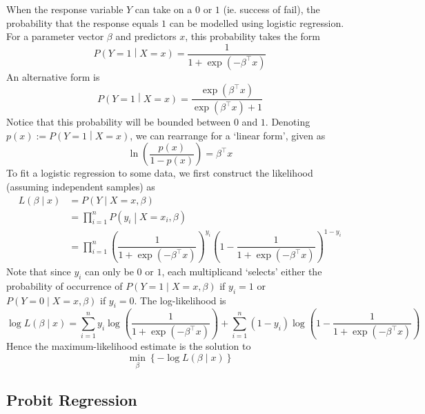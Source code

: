 \documentclass[11pt]{report} %
\begin{document}
When the response variable $Y$ can take on a $0$ or $1$ (ie. success of fail), the probability that the response equals $1$ can be modelled using logistic regression. For a parameter vector $\beta$ and predictors $x$, this probability takes the form
\begin{equation}
P\left(Y = 1\middle| X = x\right) = \dfrac{1}{1 + \exp\left(-\beta^{\top}x\right)}
\end{equation}
An alternative form is
\begin{equation}
P\left(Y = 1\middle| X = x\right) = \dfrac{\exp\left(\beta^{\top}x\right)}{\exp\left(\beta^{\top}x\right) + 1}
\end{equation}
Notice that this probability will be bounded between $0$ and $1$. Denoting $p\left(x\right) := P\left(Y = 1\middle| X = x\right)$, we can rearrange for a `linear form', given as
\begin{equation}
\ln\left(\dfrac{p\left(x\right)}{1 - p\left(x\right)}\right) = \beta^{\top}x
\end{equation}
To fit a logistic regression to some data, we first construct the likelihood (assuming independent samples) as
\begin{align}
L\left(\beta\middle|x\right) &= P\left(Y\middle|X = x, \beta\right) \\
&= \prod_{i = 1}^{n} P\left(y_{i}\middle|X = x_{i}, \beta\right) \\
&= \prod_{i = 1}^{n} \left(\dfrac{1}{1 + \exp\left(-\beta^{\top}x\right)}\right)^{y_{i}}\left(1 - \dfrac{1}{1 + \exp\left(-\beta^{\top}x\right)}\right)^{1 - y_{i}}
\end{align}
Note that since $y_{i}$ can only be $0$ or $1$, each multiplicand `selects' either the probability of occurrence of $P\left(Y = 1\middle|X = x, \beta\right)$ if $y_{i} = 1$ or $P\left(Y = 0\middle|X = x, \beta\right)$ if $y_{i} = 0$. The log-likelihood is
\begin{equation}
\log L\left(\beta\middle|x\right) = \sum_{i = 1}^{n} y_{i}\log\left(\dfrac{1}{1 + \exp\left(-\beta^{\top}x\right)}\right) + \sum_{i = 1}^{n}\left(1 - y_{i}\right)\log\left(1 - \dfrac{1}{1 + \exp\left(-\beta^{\top}x\right)}\right)
\end{equation}
Hence the maximum-likelihood estimate is the solution to
\begin{equation}
\min_{\beta} \left\{-\log L\left(\beta\middle|x\right)\right\}
\end{equation}

\subsection{Probit Regression}
\end{document}
